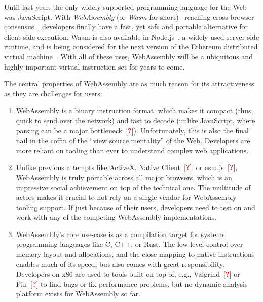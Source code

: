 \documentclass[sigplan,review,anonymous]{acmart}\settopmatter{printfolios=true,printccs=false,printacmref=false}
\newcommand{\citeTodo}{[\textcolor{red}{\bfseries?}]}
\begin{document}

Until last year, the only widely supported programming language for the Web was JavaScript. With \emph{WebAssembly} (or \emph{Wasm} for short)~\cite{Haas:2017:BWU:3062341.3062363, WasmWebsite} reaching cross-browser consensus~\cite{WasmConsensus}, developers finally have a fast, yet safe and portable alternative for client-side execution. Wasm is also available in Node.js~\cite{NodejsWebsite}, a widely used server-side runtime, and is being considered for the next version of the Ethereum distributed virtual machine~\cite{EthereumWasm}. With all of these uses, WebAssembly will be a ubiquitous and highly important virtual instruction set for years to come.

The central properties of WebAssembly are as much reason for its attractiveness as they are challenges for users: 
\begin{enumerate}[leftmargin=\parindent]
	\item WebAssembly is a binary instruction format, which makes it compact (thus, quick to send over the network) and fast to decode (unlike JavaScript, where parsing can be a major bottleneck~\citeTodo). Unfortunately, this is also the final nail in the coffin of the \enquote{view source mentality} of the Web. Developers are more reliant on tooling than ever to understand complex web applications.
	
	\item Unlike previous attempts like ActiveX, Native Client~\citeTodo, or asm.js~\citeTodo, WebAssembly is truly portable across all major browsers, which is an impressive social achievement on top of the technical one. The multitude of actors makes it crucial to not rely on a single vendor for WebAssembly tooling support. If just because of their users, developers need to test on and work with any of the competing WebAssembly implementations.
	 
	\item WebAssembly's core use-case is as a compilation target for systems programming languages like C, C++, or Rust. The low-level control over memory layout and allocations, and the close mapping to native instructions enables much of its speed, but also comes with great responsibility. Developers on x86 are used to tools built on top of, e.g., Valgrind~\citeTodo{} or Pin~\citeTodo{} to find bugs or fix performance problems, but no dynamic analysis platform exists for WebAssembly so far.
\end{enumerate}
\end{document}
